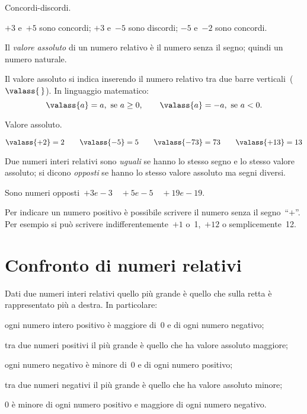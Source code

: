  \begin{esempio}
 Concordi-discordi.
 
\(+3\) e~\(+5\) sono concordi; \quad 
\(+3\) e~\(-5\) sono discordi; \quad 
\(-5\) e~\(-2\) sono concordi.
\end{esempio}

\begin{definizione}
Il \emph{valore assoluto} di un numero relativo è il numero senza il segno; 
quindi un numero naturale.
\end{definizione}

Il valore assoluto si indica inserendo il numero relativo tra due barre 
verticali~(\(\valass{\,}\)). In linguaggio
matematico:
\[ \valass{a}=a,\text{ se }a\ge0,\qquad \valass{a}=-a,\text{ se }a<0.\]
 \begin{esempio}
 Valore assoluto.
 
\(\valass{+2}=2 \qquad \valass{-5}=5 \qquad 
 \valass{-73}=73 \qquad \valass{+13}=13\)
 \end{esempio}

\begin{definizione}
 Due numeri interi relativi sono \emph{uguali} se hanno lo stesso segno e 
lo 
stesso valore assoluto;
 si dicono \emph{opposti} se hanno lo stesso valore assoluto ma segni 
diversi.
\end{definizione}

Sono numeri opposti~\(+3 e -3 \quad +5 e -5 \quad +19 e -19\).

\osservazione Per indicare un numero positivo è possibile scrivere il 
numero 
senza il segno~``\(+\)''.
Per esempio si può scrivere indifferentemente~\(+1\) o~1,~\(+12\) o 
semplicemente~12.

\section{Confronto di numeri relativi}
\label{sec:02_confronto}

Dati due numeri interi relativi quello più grande è quello che sulla retta 
è 
rappresentato più a destra.
In particolare:
 \begin{enumeratea}
 \item ogni numero intero positivo è maggiore di~0 e di ogni numero 
negativo;
 \item tra due numeri positivi il più grande è quello che ha valore 
assoluto 
maggiore;
 \item ogni numero negativo è minore di~0 e di ogni numero positivo;
 \item tra due numeri negativi il più grande è quello che ha valore 
assoluto 
minore;
 \item 0 è minore di ogni numero positivo e maggiore di ogni numero 
negativo.
 \end{enumeratea}


